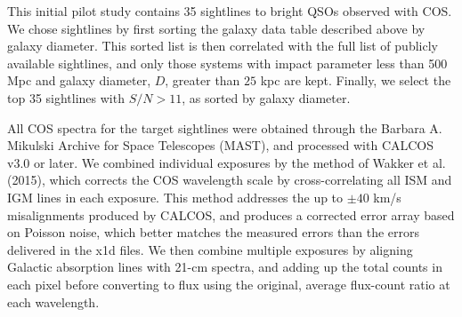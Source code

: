 \documentclass[iop]{emulateapj-rtx4}
\begin{document}
This initial pilot study contains 35 sightlines to bright QSOs observed with COS. We chose sightlines by first sorting the galaxy data table described above by galaxy diameter. This sorted list is then correlated with the full list of publicly available sightlines, and only those systems with impact parameter less than 500 Mpc and galaxy diameter, $D$, greater than $25$ kpc  are kept. Finally, we select the top 35 sightlines with $S/N > 11$, as sorted by galaxy diameter.


All COS spectra for the target sightlines were obtained through the Barbara A. Mikulski Archive for Space Telescopes (MAST), and processed with CALCOS v3.0 or later. We combined individual exposures by the method of Wakker et al. (2015), which corrects the COS wavelength scale by cross-correlating all ISM and IGM lines in each exposure. This method addresses the up to $\pm40$ km/s misalignments produced by CALCOS, and produces a corrected error array based on Poisson noise, which better matches the measured errors than the errors delivered in the x1d files. We then combine multiple exposures by aligning Galactic absorption lines with 21-cm spectra, and adding up the total counts in each pixel before converting to flux using the original, average flux-count ratio at each wavelength.
\end{document}
